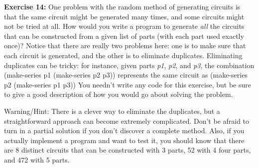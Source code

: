 {\bf Exercise 14:}
One problem with the random method of generating circuits is that the
same circuit might be generated many times, and some circuits might
not be tried at all.  How would you write a program to generate
{\it all} the circuits that can be constructed from a given list of
parts (with each part used exactly once)?  Notice that there are
really two problems here: one is to make sure that each circuit is
generated, and the other is to eliminate duplicates.  Eliminating
duplicates can be tricky: for instance, given parts {\it p1}, {\it p2},
and {\it p3}, the combination
\beginlisp
(make-series p1 (make-series p2 p3))
\endlisp
represents the same circuit as
\beginlisp
(make-series p2 (make-series p1 p3))
\endlisp
You needn't write any code for this exercise, but be sure to give a
good description of how you would go about solving the problem.


Warning/Hint: There is a clever way to eliminate the duplicates, but a
straightforward approach can become extremely complicated.  Don't be
afraid to turn in a partial solution if you don't discover a complete
method.  Also, if you actually implement a program and want to test
it, you should know that there are 8 distinct circuits that can be
constructed with 3 parts, 52 with 4 four parts, and 472 with 5 parts.


